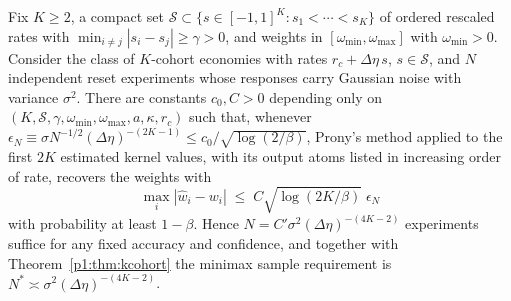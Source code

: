 \begin{theorem}\label{p1:prop:esprit}
Fix $K\ge2$, a compact set $\mathcal S\subset\{s\in[-1,1]^K:s_1<\cdots<s_K\}$ of ordered rescaled rates with $\min_{i\ne j}|s_i-s_j|\ge\gamma>0$, and weights in $[\omega_{\min},\omega_{\max}]$ with $\omega_{\min}>0$. Consider the class of $K$-cohort economies with rates $r_c+\Delta\eta\,s$, $s\in\mathcal S$, and $N$ independent reset experiments whose responses carry Gaussian noise with variance $\sigma^2$. There are constants $c_0,C>0$ depending only on $(K,\mathcal S,\gamma,\omega_{\min},\omega_{\max},a,\kappa,r_c)$ such that, whenever $\epsilon_N\equiv\sigma N^{-1/2}(\Delta\eta)^{-(2K-1)}\le c_0/\sqrt{\log(2/\beta)}$, Prony's method applied to the first $2K$ estimated kernel values, with its output atoms listed in increasing order of rate, recovers the weights with
\[
\max_i|\hat w_i-w_i|\;\le\;C\sqrt{\log(2K/\beta)}\;\epsilon_N
\]
with probability at least $1-\beta$. Hence $N=C'\sigma^2(\Delta\eta)^{-(4K-2)}$ experiments suffice for any fixed accuracy and confidence, and together with Theorem~\ref{p1:thm:kcohort} the minimax sample requirement is $N^*\asymp\sigma^2(\Delta\eta)^{-(4K-2)}$.
\end{theorem}

